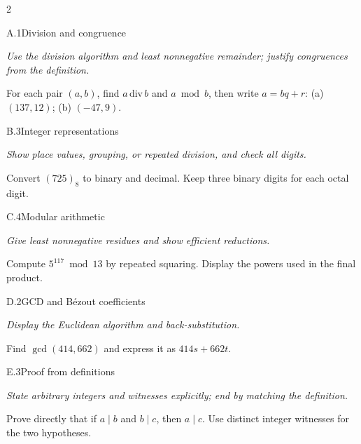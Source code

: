 \documentclass[9pt]{extarticle}
\begin{document}
\begin{multicols}{2}
\begin{CoreProblem}{A.1}{Division and congruence}
{\scriptsize\textit{Use the division algorithm and least nonnegative remainder; justify congruences from the definition.}\par}
For each pair $(a,b)$, find $a\,\mathrm{div}\,b$ and $a\bmod b$, then write
$a=bq+r$: (a) $(137,12)$; (b) $(-47,9)$.
\end{CoreProblem}
\begin{CoreProblem}{B.3}{Integer representations}
{\scriptsize\textit{Show place values, grouping, or repeated division, and check all digits.}\par}
Convert $(725)_8$ to binary and decimal. Keep three binary digits for each
octal digit.
\end{CoreProblem}
\begin{CoreProblem}{C.4}{Modular arithmetic}
{\scriptsize\textit{Give least nonnegative residues and show efficient reductions.}\par}
Compute $5^{117}\bmod13$ by repeated squaring. Display the powers used in the
final product.
\end{CoreProblem}
\columnbreak
\begin{CoreProblem}{D.2}{GCD and B\'ezout coefficients}
{\scriptsize\textit{Display the Euclidean algorithm and back-substitution.}\par}
Find $\gcd(414,662)$ and express it as $414s+662t$.
\end{CoreProblem}
\begin{CoreProblem}{E.3}{Proof from definitions}
{\scriptsize\textit{State arbitrary integers and witnesses explicitly; end by matching the definition.}\par}
Prove directly that if $a\mid b$ and $b\mid c$, then $a\mid c$. Use distinct
integer witnesses for the two hypotheses.
\end{CoreProblem}
\end{multicols}
\CoreWorkArea
\FormBreak
{}
\end{document}

